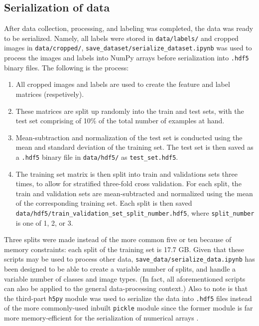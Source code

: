 \documentclass[a4paper, 11pt]{article} %
\begin{document}
	\subsection{Serialization of data}
		After data collection, processing, and labeling was completed, the data was
		ready to be serialized. Namely, all labels were stored in \texttt{data/labels/} and cropped
		images in \texttt{data/cropped/}, \texttt{save\_dataset/serialize\_dataset.ipynb}
		was used to process the images and labels into NumPy arrays before serialization
		into \texttt{.hdf5} binary files.
		\newpage
		The following is the process:
		\begin{enumerate}
			\item All cropped images and labels are used to create the feature and label matrices
			(respetively).
			\item These matrices are split up randomly into the train and test sets, with the test
			set comprising of 10\% of the total number of examples at hand.
			\item Mean-subtraction and normalization of the test set is 
			conducted using the mean \cite{sub-norm}\relax
			and standard deviation of the training set. The test set is then saved as a
			\texttt{.hdf5} binary file in \texttt{data/hdf5/} as \texttt{test\_set.hdf5}.
			\item The training set matrix is then split into train and validations sets three times,
			to allow for stratified three-fold cross validation. For each split, the train and
			validation sets are mean-subtracted and normalized using the mean of the corresponding
			training set. Each split is then saved
			\texttt{data/hdf5/train\_validation\_set\_{split\_number}.hdf5}, where
			\texttt{split\_number} is one of 1, 2, or 3.
		\end{enumerate}
		Three splits were made instead of the more common five or ten because of memory constraints: each
		split of the training set is 17.7 GB. Given that these scripts may be used to process other data,
		\texttt{save\_data/serialize\_data.ipynb} has been designed to be able to create a variable number
		of splits, and handle a variable number of classes and image types. (In fact, all aforementioned
		scripts can also be applied to the general data-processing context.)
		Also to note is that the third-part \texttt{h5py} module was used to serialize the data into
		\texttt{.hdf5} files instead of the more commonly-used inbuilt \texttt{pickle} module since
		the former module is far more memory-efficient for the serialization of 
		numerical arrays \cite{hdf5-performance}\relax.
\end{document}

